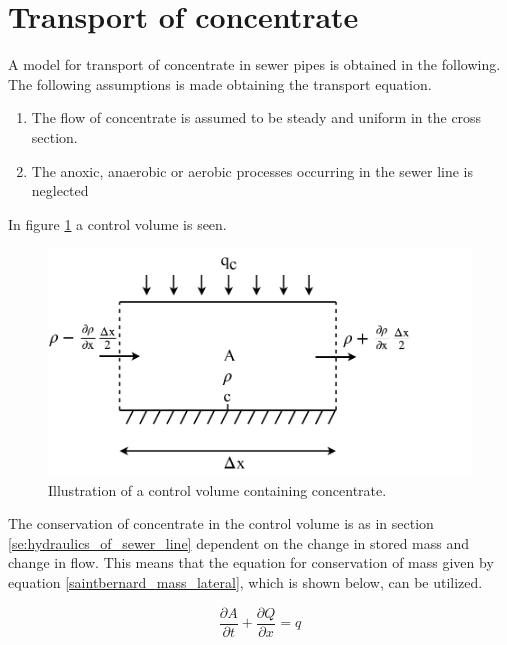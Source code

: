 \section{Transport of concentrate}\label{se:transport_of_concentrate}

A model for transport of concentrate in sewer pipes is obtained in the following.
The following assumptions is made obtaining the transport equation.

 \begin{table}[H]
\begin{enumerate}
	\item The flow of concentrate is assumed to be steady and uniform in the cross section.
	\item The anoxic, anaerobic or aerobic processes occurring in the sewer line is neglected   
\end{enumerate}
\label{tab:concentrate_flow}
\end{table}
 
In figure \ref{fig:poopvolume} a control volume is seen.
\begin{figure}[H]
\centering
\includegraphics[width=.8\textwidth]{report/modeling/pictures/poopvolume.pdf}
\caption{Illustration of a control volume containing concentrate.}
\label{fig:poopvolume}
\end{figure} 

The conservation of concentrate in the control volume is as in section \ref{se:hydraulics_of_sewer_line} dependent on the change in stored mass and change in flow. This means that the equation for conservation of mass given by equation \ref{saintbernard_mass_lateral}, which is shown below, can be utilized.

\begin{equation}	
\frac{\partial A}{\partial t} + \frac{\partial Q}{\partial x}=q
\label{eq:saintbernard_continuity_conflow}
\end{equation}


